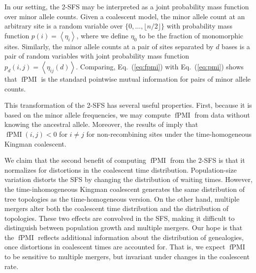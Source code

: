 \documentclass[11pt, letterpaper]{article}   	%
\newcommand{\eq}[1]{Eq.~(\ref{#1})}
\newcommand{\floor}[1]{\lfloor #1 \rfloor}
\newcommand{\E}[1]{\left< #1 \right>}
\DeclareMathOperator{\fpmi}{fPMI}
\begin{document}
In our setting, the 2-SFS may be interpreted as a joint probability mass function over minor allele counts.
Given a coalescent model, the minor allele count at an arbitrary site is a random variable over $\{0,\ldots,\floor{n/2}\}$ with probability mass function $p(i) = \E{\eta_i}$, where we define $\eta_0$ to be the fraction of monomorphic sites.
Similarly, the minor allele counts at a pair of sites separated by $d$ bases is a pair of random variables with joint probability mass function $p_d(i,j) = \E{\eta_{ij}(d)}$.
Comparing, \eq{eq:fpmi} with \eq{eq:pmi} shows that $\fpmi$ is the standard pointwise mutual information for pairs of minor allele counts.

This transformation of the 2-SFS has several useful properties.
First, because it is based on the minor allele frequencies, we may compute $\fpmi$ from data without knowing the ancestral allele.
Moreover, the results of \cite{Fu1995} imply that $\fpmi(i,j) < 0$ for $i\neq j$ for non-recombining sites under the time-homogeneous Kingman coalescent.

We claim that the second benefit of computing $\fpmi$ from the 2-SFS is that it normalizes for distortions in the coalescent time distribution.
Population-size variation distorts the SFS by changing the distribution of waiting times.
However, the time-inhomogeneous Kingman coalescent generates the same distribution of tree topologies as the time-homogeneous version.
On the other hand, multiple mergers alter both the coalescent time distribution and the distribution of topologies.
These two effects are convolved in the SFS, making it difficult to distinguish between population growth and multiple mergers.
Our hope is that the $\fpmi$ reflects additional information about the distribution of genealogies, once distortions in coalescent times are accounted for.
That is, we expect $\fpmi$ to be sensitive to multiple mergers, but invariant under changes in the coalescent rate.
\end{document}
